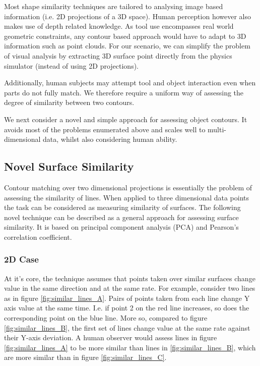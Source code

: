 \documentclass[
    floatsintext
]{article}
\begin{document}
Most shape similarity techniques are tailored to analysing image based information (i.e. 2D projections of a 3D space).
Human perception however also makes use of depth related knowledge.
As tool use encompasses real world geometric constraints, any contour based approach would have to adapt to 3D information such as point clouds.
For our scenario, we can simplify the problem of visual analysis by extracting 3D surface point directly from the physics simulator (instead of using 2D projections). 

Additionally, human subjects may attempt tool and object interaction even when parts do not fully match. 
We therefore require a uniform way of assessing the degree of similarity between two contours. 

We next consider a novel and simple approach for assessing object contours.
It avoids most of the problems enumerated above and scales well to multi-dimensional data, whilst also considering human ability.  

\pagebreak[0]
\subsection{Novel Surface Similarity}
Contour matching over two dimensional projections is essentially the problem of assessing the similarity of lines.  
When applied to three dimensional data points the task can be considered as measuring similarity of surfaces.  
The following novel technique can be described as a general approach for assessing surface similarity. 
It is based on principal component analysis (PCA) and Pearson's correlation coefficient. 

\subsubsection{2D Case}
At it's core, the technique assumes that points taken over similar surfaces change value in the same direction and at the same rate. 
For example, consider two lines as in figure \ref{fig:similar_lines_A}. Pairs of points taken from each line change Y axis value at the same time. 
I.e. if point 2 on the red line increases, so does the corresponding point on the blue line.   
More so, compared to figure \ref{fig:similar_lines_B}, the first set of lines change value at the same rate against their Y-axis deviation.
A human observer would assess lines in figure \ref{fig:similar_lines_A} to be more similar than lines in \ref{fig:similar_lines_B},
which are more similar than in figure \ref{fig:similar_lines_C}.
\end{document}
